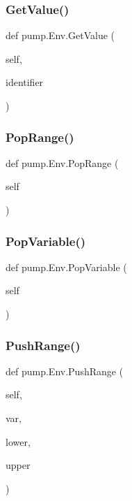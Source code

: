 \mbox{\label{classpump_1_1Env_a43c3609179d5e458266731199e35313b}} 
\subsubsection{\texorpdfstring{GetValue()}{GetValue()}}
{\footnotesize\ttfamily def pump.\+Env.\+Get\+Value (\begin{DoxyParamCaption}\item[{}]{self,  }\item[{}]{identifier }\end{DoxyParamCaption})}

\mbox{\label{classpump_1_1Env_a45474355fc03b69e7449199cc8012ba9}} 
\subsubsection{\texorpdfstring{PopRange()}{PopRange()}}
{\footnotesize\ttfamily def pump.\+Env.\+Pop\+Range (\begin{DoxyParamCaption}\item[{}]{self }\end{DoxyParamCaption})}

\mbox{\label{classpump_1_1Env_abf35f8b971acedb275bb92bb29fcd587}} 
\subsubsection{\texorpdfstring{PopVariable()}{PopVariable()}}
{\footnotesize\ttfamily def pump.\+Env.\+Pop\+Variable (\begin{DoxyParamCaption}\item[{}]{self }\end{DoxyParamCaption})}

\mbox{\label{classpump_1_1Env_a600c34cac1e4ba75406efeadb2d7dd95}} 
\subsubsection{\texorpdfstring{PushRange()}{PushRange()}}
{\footnotesize\ttfamily def pump.\+Env.\+Push\+Range (\begin{DoxyParamCaption}\item[{}]{self,  }\item[{}]{var,  }\item[{}]{lower,  }\item[{}]{upper }\end{DoxyParamCaption})}

